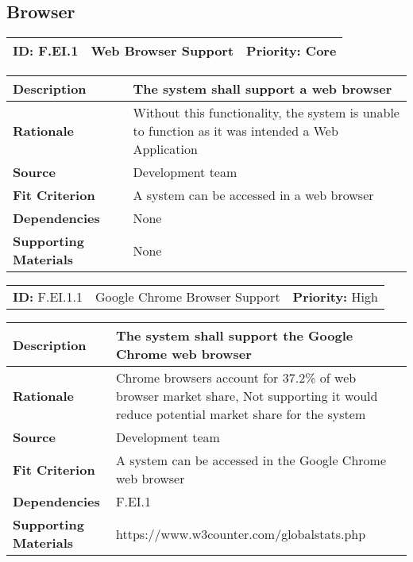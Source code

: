 \subsection{Browser}
\begin{table}[h]
    \begin{tabularx}{\textwidth}{| l | X | l |}
        \hline
        \textbf{ID:} F.EI.1 & Web Browser Support & \textbf{Priority:} Core \\ \hline
    \end{tabularx}
    \begin{tabularx}{\textwidth}{| l | X |}
        \hline
        \textbf{Description} & The system shall support a web browser \\ \hline
        \textbf{Rationale} & Without this functionality, the system is unable to function as it was intended a Web Application \\ \hline
        \textbf{Source} &  Development team\\ \hline
        \textbf{Fit Criterion} & A system can be accessed in a web browser  \\ \hline
        \textbf{Dependencies} & None \\ \hline
        \textbf{Supporting Materials} & None \\ \hline
    \end{tabularx}
\end{table}

\begin{table}[h]
    \begin{tabularx}{\textwidth}{| l | X | l |}
        \hline
        \textbf{ID:} F.EI.1.1 & Google Chrome Browser Support & \textbf{Priority:} High \\
    \end{tabularx}
    \begin{tabularx}{\textwidth}{| l | X |}
        \hline
        \textbf{Description} & The system shall support the Google Chrome web browser \\ \hline
        \textbf{Rationale} & Chrome browsers account for 37.2\% of web browser market share, Not supporting it would reduce potential market share for the system\\ \hline
        \textbf{Source} &  Development team\\ \hline
        \textbf{Fit Criterion} & A system can be accessed in the Google Chrome web browser  \\ \hline
        \textbf{Dependencies} & F.EI.1 \\ \hline
        \textbf{Supporting Materials} & https://www.w3counter.com/globalstats.php \\ \hline
    \end{tabularx}
\end{table}

